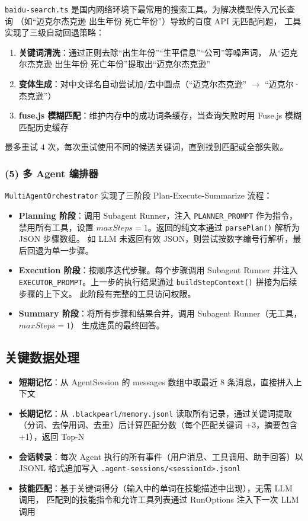 \documentclass[12pt,a4paper]{ctexart}
\begin{document}
\texttt{baidu-search.ts} 是国内网络环境下最常用的搜索工具。为解决模型传入冗长查询
（如``迈克尔杰克逊 出生年份 死亡年份''）导致的百度 API 无匹配问题，
工具实现了三级自动回退策略：

\begin{enumerate}
  \item \textbf{关键词清洗}：通过正则去除``出生年份''``生平信息''``公司''等噪声词，
    从``迈克尔杰克逊 出生年份 死亡年份''提取出``迈克尔杰克逊''
  \item \textbf{变体生成}：对中文译名自动尝试加/去中圆点（``迈克尔杰克逊'' $\to$ ``迈克尔·杰克逊''）
  \item \textbf{fuse.js 模糊匹配}：维护内存中的成功词条缓存，当查询失败时用 Fuse.js 模糊匹配历史缓存
\end{enumerate}

最多重试 4 次，每次重试使用不同的候选关键词，直到找到匹配或全部失败。

\subsubsection{(5) 多 Agent 编排器}

\texttt{MultiAgentOrchestrator} 实现了三阶段 Plan-Execute-Summarize 流程：

\begin{itemize}
  \item \textbf{Planning 阶段}：调用 Subagent Runner，注入
    \texttt{PLANNER\_PROMPT} 作为指令，
    禁用所有工具，设置 $maxSteps=1$。返回的纯文本通过 \texttt{parsePlan()}
    解析为 JSON 步骤数组。
    如 LLM 未返回有效 JSON，则尝试按数字编号行解析，最后回退为单一步骤。
  \item \textbf{Execution 阶段}：按顺序迭代步骤。每个步骤调用 Subagent Runner 并注入
    \texttt{EXECUTOR\_PROMPT}。上一步的执行结果通过
    \texttt{buildStepContext()} 拼接为后续步骤的上下文。
    此阶段有完整的工具访问权限。
  \item \textbf{Summary 阶段}：将所有步骤和结果合并，调用 Subagent
    Runner（无工具，$maxSteps=1$）
    生成连贯的最终回答。
\end{itemize}

\subsection{关键数据处理}

\begin{itemize}
  \item \textbf{短期记忆}：从 AgentSession 的 messages 数组中取最近 8 条消息，直接拼入上下文
  \item \textbf{长期记忆}：从 \texttt{.blackpearl/memory.jsonl}
    读取所有记录，通过关键词提取
    （分词、去停用词、去重）后计算匹配分数（每个匹配关键词 +3，摘要包含 +1），返回 Top-N
  \item \textbf{会话转录}：每次 Agent 执行的所有事件（用户消息、工具调用、助手回答）以 JSONL
    格式追加写入 \verb|.agent-sessions/<sessionId>.jsonl|
  \item \textbf{技能匹配}：基于关键词得分（输入中的单词在技能描述中出现），无需 LLM 调用，
    匹配到的技能指令和允许工具列表通过 RunOptions 注入下一次 LLM 调用
\end{itemize}
\end{document}

